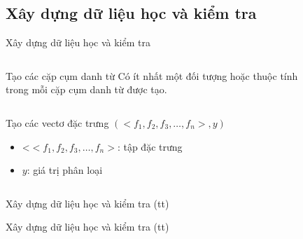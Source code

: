 \documentclass[9pt,xcolor=table,hyperref=unicode]{beamer}
\begin{document}
	\subsection{Xây dựng dữ liệu học và kiểm tra}
	\begin{frame}{Xây dựng dữ liệu học và kiểm tra}				
		\begin{columns}[t]
			\begin{column}{0.4\textwidth}
			   	\begin{block}{Tạo các cặp cụm danh từ}
					Có ít nhất một đối tượng hoặc thuộc tính trong mỗi cặp cụm danh từ được tạo.
				\end{block}
			\end{column}
			\begin{column}{0.6\textwidth}  %
			 	\begin{figure}[H]
					\LARGE 
					\centering				
					\resizebox{65mm}{!}{}	
				\end{figure}
			\end{column}
		\end{columns}
		\begin{columns}[t]
			\begin{column}{\textwidth}
			   	\begin{block}{Tạo các vectơ đặc trưng}										
					$(<f_{1},f_{2},f_{3},…,f_{n}>, y)$
					\begin{itemize}
						\item{<$<f_{1},f_{2},f_{3},…,f_{n}>$: tập đặc trưng}
						\item{$y$: giá trị phân loại}										
					\end{itemize}
				\end{block}					
			\end{column}			
		\end{columns}
	\end{frame}	

	\begin{frame}{Xây dựng dữ liệu học và kiểm tra (tt)}		
		\begin{table}[]		
		\parbox{\textwidth}{
			\centering			
			\fontsize{6pt}{7}\selectfont		
				
			\caption{Các đặc trưng được sử dụng trong hệ thống}
		}
		\end{table}
	\end{frame}	

	\begin{frame}{Xây dựng dữ liệu học và kiểm tra (tt)}		
		\begin{table}[]		
		\parbox{\textwidth}{
			\centering
			\fontsize{6pt}{7}\selectfont			
				
			\caption{Các đặc trưng được sử dụng trong hệ thống (tt)}
		}
		\end{table}
	\end{frame}
\end{document}
